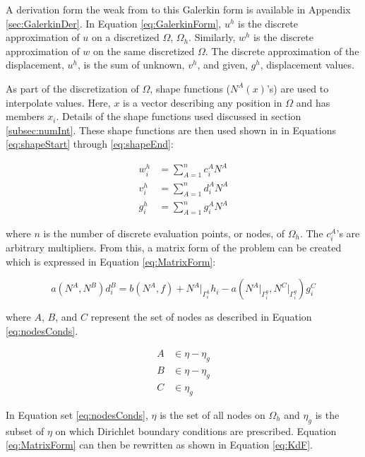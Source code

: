 \documentclass[a4paper, 12pt]{article}
\begin{document}
\noindent
A derivation form the weak from to this Galerkin form
is available in Appendix \ref{sec:GalerkinDer}.
In Equation \ref{eq:GalerkinForm}, $u^{h}$ is the discrete
approximation of $u$ on a discretized $\Omega$, $\Omega_h$. Similarly,
$w^{h}$ is the discrete approximation of $w$ on the same
discretized $\Omega$. The discrete approximation of
the displacement, $u^{h}$, is the sum of unknown, $v^{h}$,
and given, $g^{h}$, displacement values.

As part of the discretization of $\Omega$, shape functions
($N^{A}(x)$'s) are used to interpolate values. Here, $x$
is a vector describing any position in $\Omega$ and has members $x_i$.
Details of the shape functions used discussed in section \ref{subsec:numInt}.
These shape functions are then used shown in in Equations
\ref{eq:shapeStart} through \ref{eq:shapeEnd}:

\begin{align}
w^{h}_i &= \sum_{A=1}^{n} c^{A}_i N^{A}
  \label{eq:shapeStart}                       \\
v^{h}_i &= \sum_{A=1}^{n} d^{A}_i N^{A}
  \label{eq:shapeUnks}                         \\
g^{h}_i &= \sum_{A=1}^{n} g^{A}_i N^{A}
  \label{eq:shapeEnd}
\end{align}

\noindent
where $n$ is the number of discrete evaluation points, or nodes,
of $\Omega_h$. The $c^{A}_{i}$'s are arbitrary multipliers. From this, a matrix
form of the problem can be created which is expressed in
Equation \ref{eq:MatrixForm}:

\begin{equation} \label{eq:MatrixForm}
a( N^A, N^B) d^{B}_{i} =
  b( N^A, f) +
  N^A\Big|_{\Gamma_{i}^{h}} h_i -
  a( N^A\Big|_{\Gamma_{i}^{g}} , N^C\Big|_{\Gamma_{i}^{g}} ) g_{i}^C
\end{equation}

\noindent
where $A$, $B$, and $C$ represent the set of nodes as described in
Equation \ref{eq:nodesConds}.

\begin{align}
A &\in \eta - \eta_g
  \nonumber         \\
B &\in \eta - \eta_g
  \nonumber         \\
C &\in \eta_g
  \label{eq:nodesConds}
\end{align}

\noindent
In Equation set \ref{eq:nodesConds}, $\eta$ is the set of all nodes on $\Omega_h$
and $\eta_g$ is the subset of $\eta$ on which Dirichlet boundary conditions are
prescribed. Equation \ref{eq:MatrixForm} can then be rewritten as shown in
Equation \ref{eq:KdF}.
\end{document}
